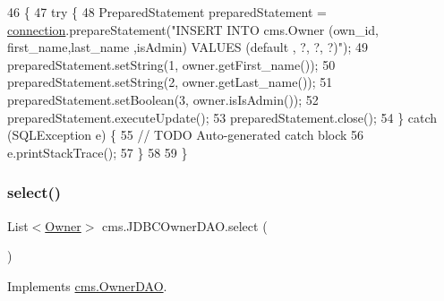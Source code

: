 \begin{DoxyCode}
46                                     \{
47         \textcolor{keywordflow}{try} \{
48             PreparedStatement preparedStatement = \mbox{\hyperlink{classcms_1_1_j_d_b_c_owner_d_a_o_a76b8cb63ccf288ce8ca2f767a045372c}{connection}}.prepareStatement(\textcolor{stringliteral}{"INSERT INTO
       cms.Owner (own\_id, first\_name,last\_name ,isAdmin) VALUES (default , ?, ?, ?)"});
49             preparedStatement.setString(1,  owner.getFirst\_name());
50             preparedStatement.setString(2,  owner.getLast\_name());
51             preparedStatement.setBoolean(3,  owner.isIsAdmin());
52             preparedStatement.executeUpdate();
53             preparedStatement.close();
54         \} \textcolor{keywordflow}{catch} (SQLException e) \{
55             \textcolor{comment}{// TODO Auto-generated catch block}
56             e.printStackTrace();
57         \}
58          
59     \}
\end{DoxyCode}
\mbox{\label{classcms_1_1_j_d_b_c_owner_d_a_o_a81952fce2cc39e648eb048d76bfb048d}} 
\subsubsection{\texorpdfstring{select()}{select()}}
{\footnotesize\ttfamily List$<$\mbox{\hyperlink{classcms_1_1_owner}{Owner}}$>$ cms.\+J\+D\+B\+C\+Owner\+D\+A\+O.\+select (\begin{DoxyParamCaption}{ }\end{DoxyParamCaption})\hspace{0.3cm}{\ttfamily [inline]}}



Implements \mbox{\hyperlink{interfacecms_1_1_owner_d_a_o_a51c6035e79a08ba4bf4396175e841133}{cms.\+Owner\+D\+AO}}.


